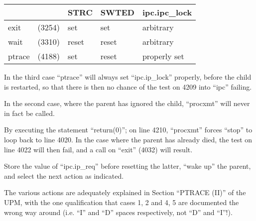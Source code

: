 \begin{center}
\begin{tabular}{lllll}
 & & STRC & SWTED & ipc.ipc\_lock\\ \hline
exit & (3254) & set & set & arbitrary\\
wait & (3310) & reset & reset & arbitrary\\
ptrace & (4188) & set & reset & properly set\\
\end{tabular}
\end{center}


In the third case ``ptrace'' will always
set ``ipc.ip\_lock'' properly, before the
child is restarted, so that there is
then no chance of the test on 4209
into ``ipc'' failing.

In the second case, where the parent
has ignored the child, ``procxmt'' will
never in fact be called.

By executing the statement ``return(0)'';
on line 4210, ``procxmt'' forces
``stop'' to loop back to line 4020. In
the case where the parent has already
died, the test on line 4022 will then
fail, and a call on ``exit'' (4032) will
result.

\bd
\item[4211:] Store the value of ``ipc.ip\_req''
 before resetting the latter,
 ``wake up'' the parent, and select
 the next action as indicated.
\ed

The various actions are adequately
explained in Section ``PTRACE (II)'' of
the UPM, with the one qualification
that cases 1, 2 and 4, 5 are documented
the wrong way around (i.e. ``I'' and ``D''
spaces respectively, not ``D'' and ``I''!).
